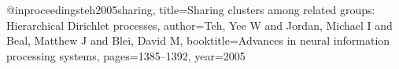 @inproceedings{teh2005sharing,
  title={Sharing clusters among related groups: Hierarchical Dirichlet processes},
  author={Teh, Yee W and Jordan, Michael I and Beal, Matthew J and Blei, David M},
  booktitle={Advances in neural information processing systems},
  pages={1385--1392},
  year={2005}
}